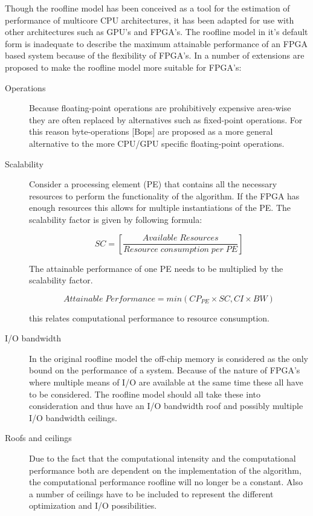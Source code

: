 Though the roofline model has been conceived as a tool for the estimation of performance of multicore CPU architectures, it has been adapted for use with other architectures such as GPU's\cite{spieringsembedded} and FPGA's\cite{spieringsembedded,daperformance}.
The roofline model in it's default form is inadequate to describe the maximum attainable performance of an FPGA based system because of the flexibility of FPGA's. In \cite{daperformance} a number of extensions are proposed to make the roofline model more suitable for FPGA's:
\begin{description}
	
	\item[Operations] Because floating-point operations are prohibitively expensive area-wise they are often replaced by alternatives such as fixed-point operations. For this reason byte-operations [Bops] are proposed as a more general alternative to the more CPU/GPU specific floating-point operations.

	\item[Scalability] Consider a processing element (PE) that contains all the necessary resources to perform the functionality of the algorithm. If the FPGA has enough resources this allows for multiple instantiations of the PE. The scalability factor is given by following formula:

	\begin{equation}
		SC = \left[\frac{Available\;Resources}{Resource\;consumption \; per \; PE}\right]
	\end{equation}

	The attainable performance of one PE needs to be multiplied by the scalability factor.

	\begin{equation}
		Attainable \; Performance = min(CP_{PE} \times SC, CI \times BW)
	\end{equation}

	this relates computational performance to resource consumption.

	\item[I/O bandwidth] In the original roofline model the off-chip memory is considered as the only bound on the performance of a system. Because of the nature of FPGA's where multiple means of I/O are available at the same time these all have to be considered. The roofline model should all take these into consideration and thus have an I/O bandwidth roof and possibly multiple I/O bandwidth ceilings.

	\item[Roofs and ceilings] Due to the fact that the computational intensity and the computational performance both are dependent on the implementation of the algorithm, the computational performance roofline will no longer be a constant. Also a number of ceilings have to be included to represent the different optimization and I/O possibilities.


\end{description}
